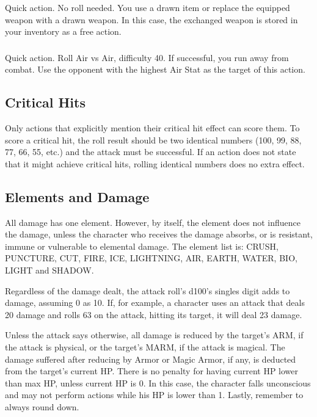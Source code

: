 \begin{multicols}{2}
\subsubsection{}
Quick action. No roll needed. You use a drawn item or replace the equipped weapon with a drawn weapon. In this case, the exchanged weapon is stored in your inventory as a free action.

\subsubsection{}
Quick action. Roll Air vs Air, difficulty 40. If successful, you run away from combat. Use the opponent with the highest Air Stat as the target of this action.

\subsection{Critical Hits}
Only actions that explicitly mention their critical hit effect can score them. To score a critical hit, the roll result should be two identical numbers (100, 99, 88, 77, 66, 55, etc.) and the attack must be successful. If an action does not state that it might achieve critical hits, rolling identical numbers does no extra effect.

\begin{center}
\end{center}

\subsection{Elements and Damage}
All damage has one element. However, by itself, the element does not influence the damage, unless the character who receives the damage absorbs, or is resistant, immune or vulnerable to elemental damage. The element list is: CRUSH, PUNCTURE, CUT, FIRE, ICE, LIGHTNING, AIR, EARTH, WATER, BIO, LIGHT and SHADOW\@. %

Regardless of the damage dealt, the attack roll’s d100’s singles digit adds to damage, assuming 0 as 10. If, for example, a character uses an attack that deals 20 damage and rolls 63 on the attack, hitting its target, it will deal 23 damage.

Unless the attack says otherwise, all damage is reduced by the target's ARM, if the attack is physical, or the target’s MARM, if the attack is magical. The damage suffered after reducing by Armor or Magic Armor, if any, is deducted from the target’s current HP\@. There is no penalty for having current HP lower than max HP, unless current HP is 0. In this case, the character falls unconscious and may not perform actions while his HP is lower than 1. Lastly, remember to always round down.


\end{multicols}
